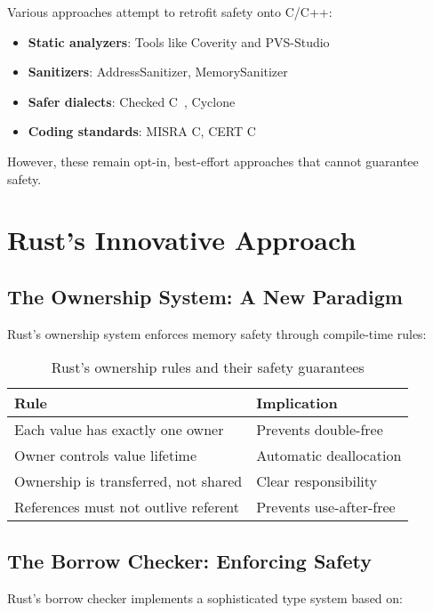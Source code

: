 \documentclass[11pt]{article}
\begin{document}
Various approaches attempt to retrofit safety onto C/C++:
\begin{itemize}
    \item \textbf{Static analyzers}: Tools like Coverity and PVS-Studio
    \item \textbf{Sanitizers}: AddressSanitizer, MemorySanitizer
    \item \textbf{Safer dialects}: Checked C~\cite{checkedc2018}, Cyclone
    \item \textbf{Coding standards}: MISRA C, CERT C
\end{itemize}

However, these remain opt-in, best-effort approaches that cannot guarantee safety.

\section{Rust's Innovative Approach}

\subsection{The Ownership System: A New Paradigm}

Rust's ownership system enforces memory safety through compile-time rules:

\begin{table}[ht]
\centering
\begin{tabular}{@{}ll@{}}
\toprule
\textbf{Rule} & \textbf{Implication} \\
\midrule
Each value has exactly one owner & Prevents double-free \\
Owner controls value lifetime & Automatic deallocation \\
Ownership is transferred, not shared & Clear responsibility \\
References must not outlive referent & Prevents use-after-free \\
\bottomrule
\end{tabular}
\caption{Rust's ownership rules and their safety guarantees}
\label{tab:ownership}
\end{table}

\subsection{The Borrow Checker: Enforcing Safety}

Rust's borrow checker implements a sophisticated type system based on:
\end{document}

